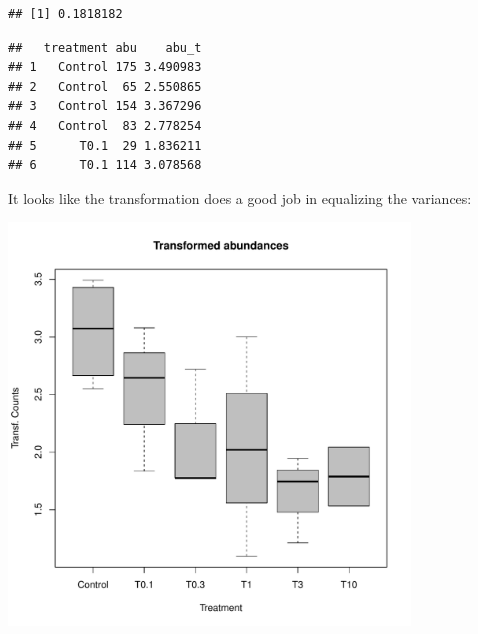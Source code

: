 \begin{knitrout}
\color{fgcolor}\small\begin{kframe}
\begin{alltt}
 \hlkwb{<-}  \hlopt{/} \hlopt{$}\hlstd{abu[dfm}\hlopt{$} \hlopt{!=} \hlstd{])}
\end{alltt}
\begin{verbatim}
## [1] 0.1818182
\end{verbatim}
\begin{alltt}
\hlopt{$} \hlkwb{<-}  \hlopt{*} \hlopt{$} \hlopt{+} \hlstd{)}
\end{alltt}
\begin{verbatim}
##   treatment abu    abu_t
## 1   Control 175 3.490983
## 2   Control  65 2.550865
## 3   Control 154 3.367296
## 4   Control  83 2.778254
## 5      T0.1  29 1.836211
## 6      T0.1 114 3.078568
\end{verbatim}
\end{kframe}
\end{knitrout}


It looks like the transformation does a good job in equalizing the variances:
\begin{knitrout}
\color{fgcolor}\small\begin{kframe}
\begin{alltt}
 \hlopt{~}   
             \hlstd{=} \hlstd{,}  \hlstd{=} \hlstd{,}
             \hlstd{=} \hlstd{,}  \hlstd{=} \hlstd{)}
\end{alltt}
\end{kframe}

{\centering \includegraphics[width=0.8\textwidth]{appendix/usetheglm/two/plot_count_trans-1} 

}



\end{knitrout}


